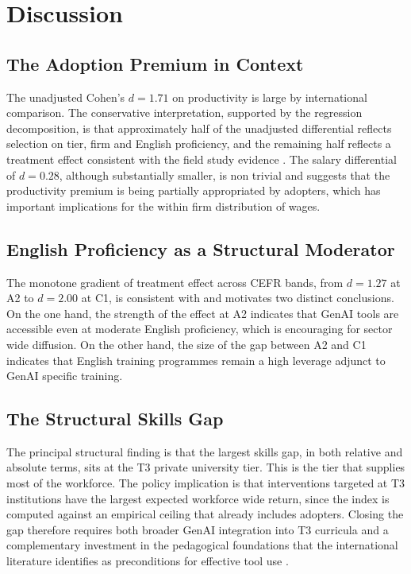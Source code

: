 \documentclass[11pt,a4paper]{report}
\begin{document}
\chapter{Discussion}

\section{The Adoption Premium in Context}

The unadjusted Cohen's $d = 1.71$ on productivity is large by
international comparison. The conservative interpretation, supported by
the regression decomposition, is that approximately half of the
unadjusted differential reflects selection on tier, firm and English
proficiency, and the remaining half reflects a treatment effect
consistent with the field study evidence
\citep{PengKalliamvakouEtAl2023,ZieglerEtAl2024,CuiDemirerEtAl2025,BrynjolfssonLiRaymond2025}.
The salary differential of $d = 0.28$, although substantially smaller,
is non trivial and suggests that the productivity premium is being
partially appropriated by adopters, which has important implications
for the within firm distribution of wages.

\section{English Proficiency as a Structural Moderator}

The monotone gradient of treatment effect across CEFR bands, from
$d = 1.27$ at A2 to $d = 2.00$ at C1, is consistent with
\citet{NurFarhanaTalukder2024} and motivates two distinct conclusions.
On the one hand, the strength of the effect at A2 indicates that GenAI
tools are accessible even at moderate English proficiency, which is
encouraging for sector wide diffusion. On the other hand, the size of
the gap between A2 and C1 indicates that English training programmes
remain a high leverage adjunct to GenAI specific training.

\section{The Structural Skills Gap}

The principal structural finding is that the largest skills gap, in
both relative and absolute terms, sits at the T3 private university
tier. This is the tier that supplies most of the workforce. The policy
implication is that interventions targeted at T3 institutions have the
largest expected workforce wide return, since the index is computed
against an empirical ceiling that already includes adopters. Closing
the gap therefore requires both broader GenAI integration into T3
curricula and a complementary investment in the pedagogical foundations
that the international literature identifies as preconditions for
effective tool use \citep{PratherEtAl2024,DennyEtAl2024}.
\end{document}
